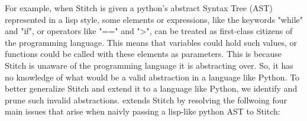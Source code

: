 
For example, when Stitch is given a python's abstract Syntax Tree (AST) represented in a lisp style, 
some elements or expressions, like the keywords "while" and "if", or operators like "==" and ">", can be treated as first-class citizens of the programming language. This means that variables could hold such values, or functions could be called with these elements as parameters.
This is because Stitch is unaware of the programming language it is abstracting over. So, it has no knowledge of what would be a valid abstraction in a language like Python. 
To better generalize Stitch and extend it to a language like Python, we identify and prune such invalid abstractions. \toolname extends Stitch by resolving the follwoing four main issues that arise when naivly passing a lisp-like python AST to Stitch: 

